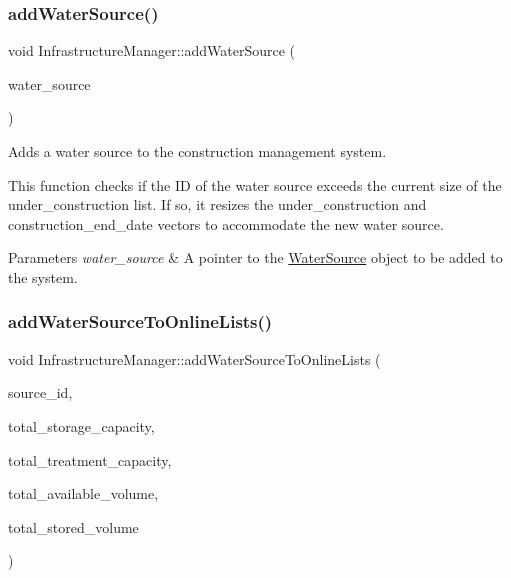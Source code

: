 \subsubsection{\texorpdfstring{add\+Water\+Source()}{addWaterSource()}}
{\footnotesize\ttfamily void Infrastructure\+Manager\+::add\+Water\+Source (\begin{DoxyParamCaption}\item[{\mbox{\hyperlink{classWaterSource}{Water\+Source}} $\ast$}]{water\+\_\+source }\end{DoxyParamCaption})}



Adds a water source to the construction management system. 

This function checks if the ID of the water source exceeds the current size of the {\ttfamily under\+\_\+construction} list. If so, it resizes the {\ttfamily under\+\_\+construction} and {\ttfamily construction\+\_\+end\+\_\+date} vectors to accommodate the new water source.


\begin{DoxyParams}{Parameters}
{\em water\+\_\+source} & A pointer to the {\ttfamily \mbox{\hyperlink{classWaterSource}{Water\+Source}}} object to be added to the system. \\
\hline
\end{DoxyParams}
\mbox{\label{classInfrastructureManager_ab66bdc91a6f60c6aea6ce0bf179df913}} 
\subsubsection{\texorpdfstring{add\+Water\+Source\+To\+Online\+Lists()}{addWaterSourceToOnlineLists()}}
{\footnotesize\ttfamily void Infrastructure\+Manager\+::add\+Water\+Source\+To\+Online\+Lists (\begin{DoxyParamCaption}\item[{int}]{source\+\_\+id,  }\item[{double \&}]{total\+\_\+storage\+\_\+capacity,  }\item[{double \&}]{total\+\_\+treatment\+\_\+capacity,  }\item[{double \&}]{total\+\_\+available\+\_\+volume,  }\item[{double \&}]{total\+\_\+stored\+\_\+volume }\end{DoxyParamCaption})}



